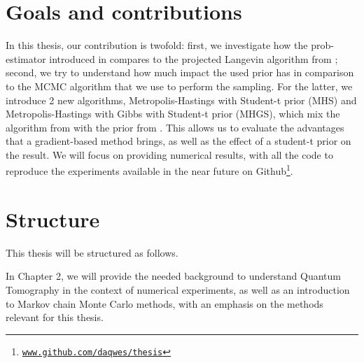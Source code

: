 \documentclass[12pt]{memoir}
\begin{document}






\section{Goals and contributions}\label{section:goals-contributions}
In this thesis, our contribution is twofold: first, we investigate how the prob-estimator introduced in \cite{MA17} compares to the projected Langevin algorithm from \cite{meth:bayesian:Langevin:ACMT2024}; second, we try to understand how much impact the used prior has in comparison to the MCMC algorithm that we use to perform the sampling. For the latter, we introduce 2 new algorithms, Metropolis-Hastings with Student-t prior (MHS) and Metropolis-Hastings with Gibbs with Student-t prior (MHGS), which mix the algorithm from \cite{MA17} with the prior from \cite{meth:bayesian:Langevin:ACMT2024}. This allows us to evaluate the advantages that a gradient-based method brings, as well as the effect of a student-t prior on the result. We will focus on providing numerical results, with all the code to reproduce the experiments available in the near future on Github\footnote{\texttt{\url{www.github.com/daqwes/thesis}}}.

\section{Structure}
This thesis will be structured as follows.

In Chapter 2, we will provide the needed background to understand Quantum Tomography in the context of numerical experiments, as well as an introduction to Markov chain Monte Carlo methods, with an emphasis on the methods relevant for this thesis.\medbreak
\end{document}
